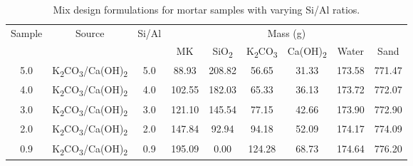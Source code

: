 \begin{table}[H]
  \centering
  \caption{Mix design formulations for mortar samples with varying Si/Al ratios.}
  \vspace{0.5cm}
  {\footnotesize %
  \renewcommand{\arraystretch}{1.3} %
  \begin{tabular}{c c c c c c c c c}
    \hline
    \multirow{2}{*}{Sample} & \multirow{2}{*}{Source} & \multirow{2}{*}{Si/Al} & \multicolumn{6}{c}{Mass (g)} \\
    \cline{4-9}
    & & & MK & SiO\textsubscript{2} & K\textsubscript{2}CO\textsubscript{3} & Ca(OH)\textsubscript{2} & Water & Sand \\
    \hline
    5.0 & K\textsubscript{2}CO\textsubscript{3}/Ca(OH)\textsubscript{2} & 5.0 & 88.93 & 208.82 & 56.65 & 31.33 & 173.58 & 771.47 \\
    4.0 & K\textsubscript{2}CO\textsubscript{3}/Ca(OH)\textsubscript{2} & 4.0 & 102.55 & 182.03 & 65.33 & 36.13 & 173.72 & 772.07 \\
    3.0 & K\textsubscript{2}CO\textsubscript{3}/Ca(OH)\textsubscript{2} & 3.0 & 121.10 & 145.54 & 77.15 & 42.66 & 173.90 & 772.90 \\
    2.0 & K\textsubscript{2}CO\textsubscript{3}/Ca(OH)\textsubscript{2} & 2.0 & 147.84 & 92.94 & 94.18 & 52.09 & 174.17 & 774.09 \\
    0.9 & K\textsubscript{2}CO\textsubscript{3}/Ca(OH)\textsubscript{2} & 0.9 & 195.09 & 0.00 & 124.28 & 68.73 & 174.64 & 776.20 \\
    \hline
  \end{tabular}
  }
\label{tab:mortar_mix_designs}
\end{table}